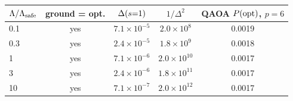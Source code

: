 \begin{tabular}{lcccc}
\toprule
$\Lambda/\Lambda_{\mathrm{safe}}$ & ground = opt. & $\Delta(s{=}1)$ & $1/\Delta^2$ & QAOA $P(\mathrm{opt})$, $p{=}6$ \\
\midrule
0.1 & yes & $7.1\times10^{-5}$ & $2.0\times10^{8}$ & 0.0019 \\
0.3 & yes & $2.4\times10^{-5}$ & $1.8\times10^{9}$ & 0.0018 \\
1 & yes & $7.1\times10^{-6}$ & $2.0\times10^{10}$ & 0.0017 \\
3 & yes & $2.4\times10^{-6}$ & $1.8\times10^{11}$ & 0.0017 \\
10 & yes & $7.1\times10^{-7}$ & $2.0\times10^{12}$ & 0.0017 \\
\bottomrule
\end{tabular}
